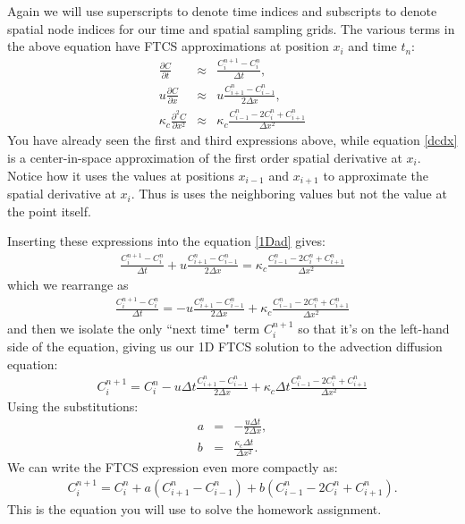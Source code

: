 \documentclass[11pt, oneside]{article}   	%
\begin{document}
Again we will use superscripts to denote time indices and subscripts to denote spatial node indices for our time and spatial sampling grids. The various terms in the above equation have FTCS approximations at position $ x_i$ and time $ t_n$:
\begin{eqnarray}
	\frac{\partial C}{\partial t} &\approx& \frac{C^{n+1}_i - C^n_i}{\Delta t} , \\
	u\frac{\partial C}{\partial x} &\approx& u \frac{C^{n}_{i+1} - C^n_{i-1}}{2\Delta x} , \label{dcdx} \\
	\kappa_c\frac{\partial^2 C}{\partial x^2} &\approx& \kappa_c \frac{C^{n}_{i-1} - 2 C^n_{i}+C^n_{i+1}}{\Delta x^2}
\end{eqnarray}
You have already seen the first and third expressions above, while equation \ref{dcdx} is a center-in-space approximation of the first order spatial derivative at $x_i$. Notice how it uses the values at positions $x_{i-1}$ and $x_{i+1}$ to approximate the spatial derivative at $x_i$. Thus is uses the neighboring values but not the value at the point itself. 

Inserting these expressions into the equation \ref{1Dad} gives:
\begin{eqnarray}
	 \frac{C^{n+1}_i - C^n_i}{\Delta t} + u \frac{C^{n}_{i+1} - C^n_{i-1}}{2\Delta x} = \kappa_c \frac{C^{n}_{i-1} - 2 C^n_{i}+C^n_{i+1}}{\Delta x^2}
\end{eqnarray}
which we rearrange as
\begin{eqnarray}
	 \frac{C^{n+1}_i - C^n_i}{\Delta t} = - u \frac{C^{n}_{i+1} - C^n_{i-1}}{2\Delta x} + \kappa_c \frac{C^{n}_{i-1} - 2 C^n_{i}+C^n_{i+1}}{\Delta x^2}
\end{eqnarray}
and then we isolate the only ``next time" term $C^{n+1}_i$ so that it's on the left-hand side of the equation, giving us our 1D FTCS solution to the advection diffusion equation:
\begin{eqnarray}
	C^{n+1}_i = C^n_i - u \Delta t \frac{C^{n}_{i+1} - C^n_{i-1}}{2\Delta x} + \kappa_c \Delta t \frac{C^{n}_{i-1} - 2 C^n_{i}+C^n_{i+1}}{\Delta x^2}
\end{eqnarray}
Using the substitutions:
\begin{eqnarray}
	a &=&  - \frac{ u \Delta t}{2\Delta x},  \\
	b &=&   \frac{\kappa_c \Delta t}{\Delta x^2}.
\end{eqnarray}
We can write the FTCS expression even more compactly as:
\begin{eqnarray}
	C^{n+1}_i = C^n_i + a \left ( {C^{n}_{i+1} - C^n_{i-1}}\right ) +  b 
\left ( {C^{n}_{i-1} - 2 C^n_{i}+C^n_{i+1}} \right ).
\end{eqnarray}
This is the equation you will use to solve the homework assignment.
\end{document}
